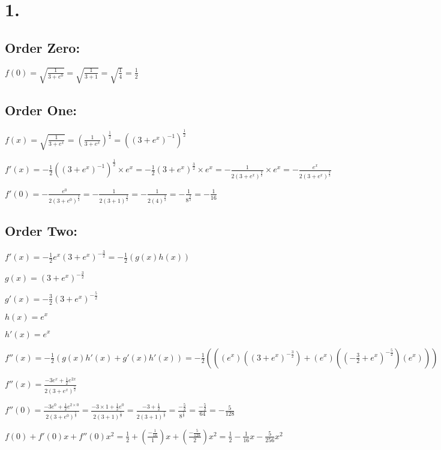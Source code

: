 \section*{1.}

\subsection*{Order Zero:}

$f(0) = \sqrt{\frac{1}{3+e^0}} = \sqrt{\frac{1}{3+1}} = \sqrt{\frac{1}{4}} = \frac{1}{2}$

\subsection*{Order One:}

$f(x) = \sqrt{\frac{1}{3+e^x}} = (\frac{1}{3 + e^x})^{\frac{1}{2}} =  ((3+e^x)^{-1})^{\frac{1}{2}} $

$f'(x) = -\frac{1}{2}((3+e^x)^{-1})^{\frac{1}{2}} \times e^x = -\frac{1}{2}(3+e^x)^{\frac{3}{2}} \times e^x = - \frac{1}{2(3 + e^x)^{\frac{3}{2}}} \times e^x= - \frac{e^x}{2(3 + e^x)^{\frac{3}{2}}}$

$f'(0) = -\frac{e^0}{2(3+e^0)^{\frac{3}{2}}} = -\frac{1}{2(3+1)^{\frac{3}{2}}} = -\frac{1}{2(4)^\frac{3}{2}} = -\frac{1}{8^{\frac{3}{2}}} = -\frac{1}{16}$

\subsection*{Order Two:}

$f'(x) = -\frac{1}{2}e^x(3 + e^x)^{-\frac{3}{2}} = -\frac{1}{2}(g(x)h(x))$

$g(x) = (3 + e^x)^{-\frac{3}{2}}$

$g'(x) = -\frac{3}{2}(3 + e^x)^{-\frac{5}{2}}$

$h(x) = e^x$

$h'(x) = e^x$

$f''(x) = -\frac{1}{2}(g(x)h'(x) + g'(x)h'(x)) = -\frac{1}{2}(((e^x)((3 + e^x)^{-\frac{3}{2}})+(e^x)((-\frac{3}{2} + e^x)^{-\frac{5}{2}})(e^x)))$

$f''(x) =  \frac{-3e^x + \frac{1}{2}e^{2x}}{2(3+e^x)^{\frac{5}{2}}}$

$f''(0) =  \frac{-3e^0 + \frac{1}{2}e^{2 \times 0}}{2(3+e^0)^{\frac{5}{2}}} = \frac{-3 \times 1 + \frac{1}{2}e^0}{2(3+1)^{\frac{5}{2}}} = \frac{-3 + \frac{1}{2}}{2(3+1)^{\frac{5}{2}}} = \frac{-\frac{5}{2}}{8^{\frac{5}{2}}} = \frac{-\frac{5}{2}}{64} = -\frac{5}{128}$

$f(0) + f'(0)x + f''(0)x^2 = \frac{1}{2} + (\frac{-\frac{1}{16}}{1})x + (\frac{-\frac{5}{128}}{2})x^2 = \boxed{\frac{1}{2} - \frac{1}{16}x - \frac{5}{256}x^2}$

